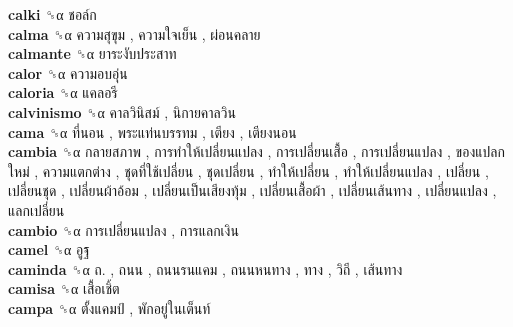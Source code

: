 \textbf{calki} ␝α   ชอล์ก   \\
\textbf{calma} ␝α   ความสุขุม ,  ความใจเย็น ,  ผ่อนคลาย   \\
\textbf{calmante} ␝α   ยาระงับประสาท   \\
\textbf{calor} ␝α   ความอบอุ่น   \\
\textbf{caloria} ␝α   แคลอรี   \\
\textbf{calvinismo} ␝α   คาลวินิสม์ ,  นิกายคาลวิน   \\
\textbf{cama} ␝α   ที่นอน ,  พระแท่นบรรทม ,  เตียง ,  เตียงนอน   \\
\textbf{cambia} ␝α   กลายสภาพ ,  การทำให้เปลี่ยนแปลง ,  การเปลี่ยนเสื้อ ,  การเปลี่ยนแปลง ,  ของแปลกใหม่ ,  ความแตกต่าง ,  ชุดที่ใช้เปลี่ยน ,  ชุดเปลี่ยน ,  ทำให้เปลี่ยน ,  ทำให้เปลี่ยนแปลง ,  เปลี่ยน ,  เปลี่ยนชุด ,  เปลี่ยนผ้าอ้อม ,  เปลี่ยนเป็นเสียงทุ้ม ,  เปลี่ยนเสื้อผ้า ,  เปลี่ยนเส้นทาง ,  เปลี่ยนแปลง ,  แลกเปลี่ยน   \\
\textbf{cambio} ␝α   การเปลี่ยนแปลง ,  การแลกเงิน   \\
\textbf{camel} ␝α   อูฐ   \\
\textbf{caminda} ␝α   ถ. ,  ถนน ,  ถนนรนแคม ,  ถนนหนทาง ,  ทาง ,  วิถี ,  เส้นทาง   \\
\textbf{camisa} ␝α   เสื้อเชิ้ต   \\
\textbf{campa} ␝α   ตั้งแคมป์ ,  พักอยู่ในเต็นท์   \\

